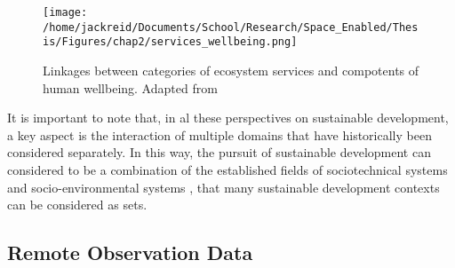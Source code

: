 \documentclass[notitlepage]{article}
\begin{document}
\begin{figure}[h]
	\centering
	\texttt{[image: /home/jackreid/Documents/School/Research/Space\_Enabled/Thesis/Figures/chap2/services\_wellbeing.png]}
	\caption[Linkages between categories of ecosystem services and compotents of human wellbeing]{Linkages between categories of ecosystem services and compotents of human wellbeing. Adapted from \cite{reidEcosystemsHumanWellbeing2005}}
	\label{fig:services_wellbeing}
\end{figure}

It is important to note that, in al these perspectives on sustainable development, a key aspect is the interaction of multiple domains that have historically been considered separately. In this way, the pursuit of sustainable development can considered to be a combination of the established fields of sociotechnical systems \cite{rouseUnderstandingChangeComplex2012,siddiqiSociotechnicalSystemsSustainability2017,sussmanTeachingComplexSociotechnical2010} and socio-environmental systems \cite{elsawahEightGrandChallenges2020}, that many  sustainable development contexts can be considered as \acf{sets}.

\subsection{Remote Observation Data} \label{sec:remote}
\end{document}
